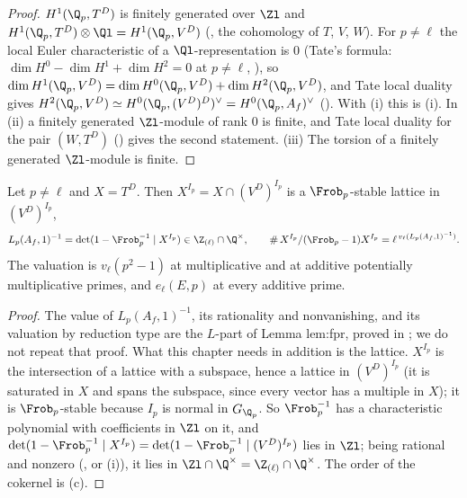 \begin{proof}
$H^1(\Q_p,T^D)$ is finitely generated over $\Zl$ and $H^1(\Q_p,T^D)\otimes\Ql=H^1(\Q_p,V^D)$ (, the cohomology of $T$, $V$, $W$). For $p\ne\ell$ the local Euler
characteristic of a $\Ql$-representation is $0$ (Tate's formula: $\dim H^0-\dim H^1+\dim H^2=0$ at $p\ne\ell$, ), so
$\dim H^1(\Q_p,V^D)=\dim H^0(\Q_p,V^D)+\dim H^2(\Q_p,V^D)$, and Tate local duality gives
$H^2(\Q_p,V^D)\simeq H^0(\Q_p,(V^D)^D)^\vee=H^0(\Q_p,A_f)^\vee$ (). With (i) this is (i). In (ii) a finitely
generated $\Zl$-module of rank $0$ is finite, and Tate local duality for the pair $(W,T^D)$ () gives the second statement. (iii) The torsion
of a finitely generated $\Zl$-module is finite.
\end{proof}

\begin{lemma}\label{lem:blochkato:euler-integral}
Let $p\ne\ell$ and $X=T^D$. Then $X^{I_p}=X\cap(V^D)^{I_p}$ is a $\Frob_p$-stable lattice in $(V^D)^{I_p}$,
\[
L_p(A_f,1)^{-1}=\det(1-\Frob_p^{-1}\mid X^{I_p})\in\Z_{(\ell)}\cap\Q^\times,\qquad\#\,X^{I_p}/(\Frob_p-1)X^{I_p}=\ell^{\,v_\ell(L_p(A_f,1)^{-1})}.
\]
The valuation is $v_\ell(p^2-1)$ at multiplicative and at additive potentially multiplicative primes, and $e_\ell(E,p)$ at every additive prime.
\end{lemma}

\begin{proof}
The value of $L_p(A_f,1)^{-1}$, its rationality and nonvanishing, and its valuation by reduction type are the $L$-part of Lemma lem:fpr, proved in
; we do not repeat that proof. What this chapter needs in addition is the lattice. $X^{I_p}$ is the intersection of a lattice with a subspace, hence
a lattice in $(V^D)^{I_p}$ (it is saturated in $X$ and spans the subspace, since every vector has a multiple in $X$); it is $\Frob_p$-stable because $I_p$ is normal in
$G_{\Q_p}$. So $\Frob_p^{-1}$ has a characteristic polynomial with coefficients in $\Zl$ on it, and $\det(1-\Frob_p^{-1}\mid X^{I_p})=\det(1-\Frob_p^{-1}\mid(V^D)^{I_p})$ lies
in $\Zl$; being rational and nonzero (, or (i)), it lies in $\Zl\cap\Q^\times=\Z_{(\ell)}\cap\Q^\times$. The order of
the cokernel is (c).
\end{proof}

